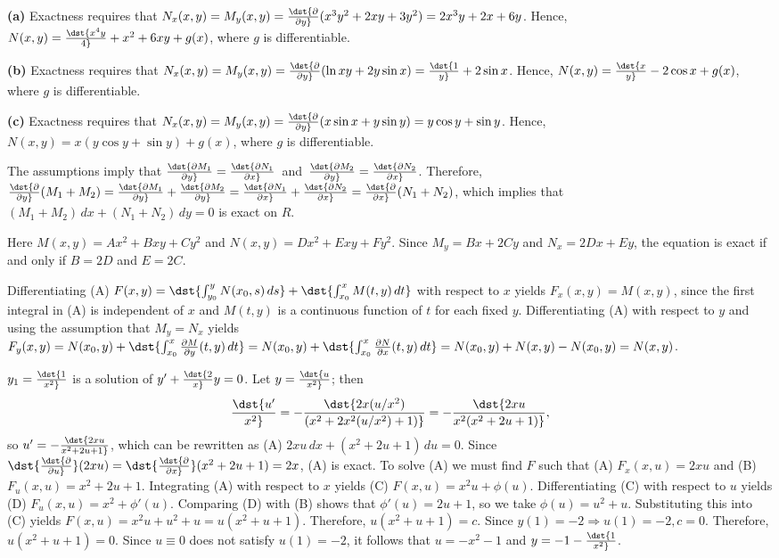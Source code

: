 \documentclass[dvips]{book}
\renewcommand{\exer}[1]{\par\medskip\;\noindent{\color{red}\bf #1.}}
\numberwithin{example}{section}
\numberwithin{equation}{section}
\numberwithin{theorem}{section}
\numberwithin{table}{section}
\numberwithin{figure}{section}
\begin{document}
\exer{2.5.30}
{\bf (a)}
Exactness requires that
$N_x(x,y)=M_y(x,y)=\dst{\partial\over\partial
y}(x^3y^2+2xy+3y^2)=2x^3y+2x+6y$.
 Hence, $N(x,y)=\dst{x^4y\over4}+x^2+6xy+g(x)$,
where $g$ is  differentiable.

{\bf (b)}
Exactness requires that
$N_x(x,y)=M_y(x,y)=\dst{\partial\over\partial y}(\ln xy+2y\sin
x)=\dst{1\over y}+2\sin x$.
 Hence, $N(x,y)=\dst{x\over y}-2\cos x+g(x)$,
where $g$ is  differentiable.

{\bf (c)}
Exactness requires that
$N_x(x,y)=M_y(x,y)=\dst{\partial\over\partial y}(x\sin x+y\sin
y)=y\cos y+\sin y$.
 Hence, $N(x,y)=x(y\cos y+\sin y)+g(x)$,
where $g$ is  differentiable.

\exer{2.5.32}
 The assumptions imply that
$\dst{\partial M_1\over\partial y}=\dst{\partial N_1\over\partial x}$\
and\ $\dst{\partial M_2\over\partial y}=\dst{\partial N_2\over\partial
x}$. Therefore, $\dst{\partial \over\partial
y}(M_1+M_2)=\dst{\partial M_1\over\partial y}+\dst{\partial
M_2\over\partial y}=\dst{\partial N_1\over\partial x}+\dst{\partial
N_2\over\partial x}=\dst{\partial \over\partial x}(N_1+N_2)$,
which implies that $(M_1+M_2)\,dx+(N_1+N_2)\,dy=0$ is exact on $R$.


\exer{2.5.34}
Here $M(x,y)=Ax^2+Bxy+Cy^2$ and
$N(x,y)=Dx^2+Exy+Fy^2$. Since $M_y=Bx+2Cy$ and $N_x=2Dx+Ey$, the
equation is exact if and only if $B=2D$ and $E=2C$.


\exer{2.5.36}
Differentiating (A)
$F(x,y)=\dst{\int^y_{y_0}N(x_0,s)\,ds}+\dst{\int^x_{x_0}M(t,y)\,dt}$
with respect to $x$ yields $F_x(x,y)=M(x,y)$, since the first
integral
in (A) is independent of $x$ and $M(t,y)$ is a continuous function
of
$t$ for each fixed $y$. Differentiating  (A)  with respect to $y$
and using the assumption that $M_y=N_x$ yields
$F_y(x,y)=N(x_0,y)+\dst{\int^x_{x_0}{\partial M
\over\partial y}(t,y)\,dt}
=N(x_0,y)+\dst{\int^x_{x_0}{\partial N
\over\partial x} (t,y)\,dt}
=N(x_0,y)+N(x,y)-N(x_0,y)=N(x,y)$.


\exer{2.5.38}
$y_1=\dst{1\over x^2}$ is a solution of $y'+\dst{2\over x}y=0$.
Let $y=\dst{u\over x^2}$; then
$$
\dst{u'\over x^2}=-\dst{2x(u/x^2)\over
\left(x^2+2x^2(u/x^2)+1\right)}=
-\dst{2xu\over x^2(x^2+2u+1)},
$$
so  $u'=-\dst{2xu\over x^2+2u+1}$, which can be rewritten as (A)
$2xu\,dx+(x^2+2u+1)\,du=0$. Since $\dst{\dst{\partial \over\partial
u}}(2xu)=\dst{\dst{\partial \over\partial x}}(x^2+2u+1)=2x$, (A)
is exact. To solve (A)
we must find $F$ such that
(A) $F_x(x,u)=2xu$ and
(B) $F_u(x,u)=x^2+2u+1$.
Integrating (A) with respect to $x$ yields
(C) $F(x,u)=x^2u+\phi(u)$.
Differentiating (C) with respect to $u$  yields
(D) $F_u(x,u)=x^2+\phi'(u)$.
Comparing (D) with (B)  shows that
$\phi'(u)=2u+1$, so we take
$\phi(u)=u^2+u$.
Substituting this into (C) yields
$F(x,u)=x^2u+u^2+u=u(x^2+u+1)$.
Therefore, $u(x^2+u+1)=c$.
Since $y(1)=-2\Rightarrow u(1)=-2,
c=0$. Therefore,  $u(x^2+u+1)=0$. Since $u\equiv0$ does not satisfy
$u(1)=-2$, it follows that $u=-x^2-1$ and $y=-1-\dst{1\over x^2}$.
\end{document}

